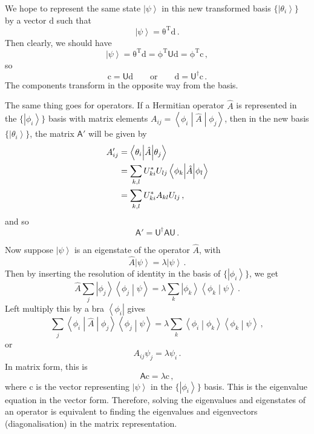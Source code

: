 \documentclass{article}
\theoremstyle{plain}\theoremheaderfont{\normalfont\itshape}\theorembodyfont{\rmfamily}\theoremseparator{.}\newtheorem*{rem}{Remark}\newtheorem*{ex}{Example}\newtheorem*{proof}{Proof}\newtheorem*{altp}{Alternative proof}
\theoremstyle{plain}\theoremheaderfont{\normalfont\bfseries}\theorembodyfont{\rmfamily}\theoremseparator{.}\newtheorem{thm}{Theorem}[section]\newtheorem{lem}[thm]{Lemma}\newtheorem{prop}[thm]{Proposition}\newtheorem*{cor}{Corollary}\newtheorem{defn}[thm]{Definition}\newtheorem{clm}[thm]{Claim}\newtheorem{clminproof}{Claim}
\theoremstyle{break}\theoremheaderfont{\normalfont\itshape}\theorembodyfont{\rmfamily}\theoremseparator{.\medskip}\newtheorem*{proofskip}{Proof}\newtheorem*{exs}{Examples}\newtheorem*{rems}{Remarks}
\theoremstyle{break}\theoremheaderfont{\normalfont\bfseries}\theorembodyfont{\rmfamily}\theoremseparator{.\medskip}\newtheorem{lemskip}[thm]{Lemma}\newtheorem{defnskip}[thm]{Definition}\newtheorem{propskip}[thm]{Proposition}\newtheorem{thmskip}[thm]{Theorem}
\numberwithin{equation}{section}
\newcommand{\tp}{^\mathrm{T}}
\newcommand{\bra}[1]{\left\langle #1 \right|}
\newcommand{\ket}[1]{\left| #1 \right\rangle}
\newcommand{\braket}[2]{\left\langle #1 \middle| #2 \right\rangle}
\newcommand{\mel}[3]{\left\langle #1 \middle| #2 \middle| #3 \right\rangle}
\newcommand{\vb}[1]{\bm{\mathrm{#1}}}
\begin{document}
    We hope to represent the same state \(\ket{\psi}\) in this new transformed basis \(\{\ket{\theta_i}\}\) by a vector \(\vb{d}\) such that
    \begin{equation}
        \ket{\psi}=\vb{\theta}\tp\vb{d}\,.
    \end{equation}
    Then clearly, we should have
    \begin{equation}
        \ket{\psi}=\vb{\theta}\tp\vb{d}=\vb{\phi}\tp\mathsf{U}\vb{d}=\vb{\phi}\tp\vb{c}\,,
    \end{equation}
    so
    \begin{equation}\label{component_transformation}
        \vb{c}=\mathsf{U}\vb{d}\qquad\text{or}\qquad\vb{d}=\mathsf{U}^\dagger\vb{c}\,.
    \end{equation}
    The components transform in the opposite way from the basis.

    The same thing goes for operators. If a Hermitian operator \(\hat{A}\) is represented in the \(\{\ket{\phi_i}\}\) basis with matrix elements \(A_{ij}=\mel{\phi_i}{\hat{A}}{\phi_j}\), then in the new basis \(\{\ket{\theta_i}\}\), the matrix \(\mathsf{A}'\) will be given by
    \begin{align}
        A_{ij}'&=\mel{\theta_i}{\hat{A}}{\theta_j}\notag\\
        &=\sum_{k,l}U_{ki}^*U_{lj}\mel{\phi_k}{\hat{A}}{\phi_l}\notag\\
        &=\sum_{k,l}U_{ki}^*A_{kl}U_{lj}\,,
    \end{align}
    and so
    \begin{equation}
        \mathsf{A}'=\mathsf{U}^\dagger\mathsf{A}\mathsf{U}\,.
    \end{equation}
    
    Now suppose \(\ket{\psi}\) is an eigenstate of the operator \(\hat{A}\), with
    \begin{equation}
        \hat{A}\ket{\psi}=\lambda\ket{\psi}\,.
    \end{equation}
    Then by inserting the resolution of identity in the basis of \(\{\ket{\phi_i}\}\), we get
    \begin{equation}
        \hat{A}\sum_j\ket{\phi_j}\braket{\phi_j}{\psi}=\lambda\sum_k \ket{\phi_k}\braket{\phi_k}{\psi}\,.
    \end{equation}
    Left multiply this by a bra \(\bra{\phi_i}\) gives
    \begin{equation}
        \sum_j \mel{\phi_i}{\hat{A}}{\phi_j}\braket{\phi_j}{\psi}=\lambda \sum_k \braket{\phi_i}{\phi_k}\braket{\phi_k}{\psi}\,, 
    \end{equation}
    or
    \begin{equation}
        A_{ij}\psi_j = \lambda\psi_i\,.
    \end{equation}
    In matrix form, this is
    \begin{equation}
        \mathsf{A}\vb{c}=\lambda\vb{c}\,,
    \end{equation}
    where \(\vb{c}\) is the vector representing \(\ket{\psi}\) in the \(\{\ket{\phi_i}\}\) basis. This is the eigenvalue equation in the vector form. Therefore, solving the eigenvalues and eigenstates of an operator is equivalent to finding the eigenvalues and eigenvectors (diagonalisation) in the matrix representation.
\end{document}
